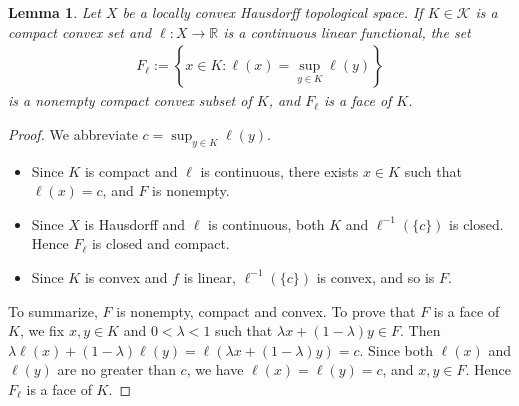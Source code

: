 \documentclass{article}
\numberwithin{equation}{section}
\newcommand{\bbR}{\mathbb{R}}
\newcommand{\scr}{\mathscr}
\theoremstyle{plain}
\newtheorem{lemma}[theorem]{Lemma}
\theoremstyle{definition}
\begin{document}
\begin{lemma}\label{kmlemma3}
	Let $X$ be a locally convex Hausdorff topological space. If $K\in\scr{K}$ is a compact convex set and $\ell:X\to\bbR$ is a continuous linear functional, the set
	\begin{align*}
		F_\ell:=\left\{x\in K:\ell(x)=\sup_{y\in K}\ell(y)\right\}
	\end{align*}
	is a nonempty compact convex subset of $K$, and $F_\ell$ is a face of $K$.
\end{lemma}
\begin{proof}
	We abbreviate $c=\sup_{y\in K} \ell(y)$. 
	\begin{itemize}
		\item Since $K$ is compact and $\ell$ is continuous, there exists $x\in K$ such that $\ell(x)=c$, and $F$ is nonempty. 
		\item Since $X$ is Hausdorff and $\ell$ is continuous, both $K$ and $\ell^{-1}(\{c\})$ is closed. Hence $F_\ell$ is closed and compact.
		\item Since $K$ is convex and $f$ is linear, $\ell^{-1}(\{c\})$ is convex, and so is $F$.
	\end{itemize}
	To summarize, $F$ is nonempty, compact and convex. To prove that $F$ is a face of $K$, we fix $x,y\in K$ and $0<\lambda<1$ such that $\lambda x+(1-\lambda)y\in F$. Then $\lambda \ell(x)+(1-\lambda)\ell(y)=\ell(\lambda x+(1-\lambda)y)=c$. Since both $\ell(x)$ and $\ell(y)$ are no greater than $c$, we have $\ell(x)=\ell(y)=c$, and $x,y\in F$. Hence $F_\ell$ is a face of $K$.
\end{proof}
\end{document}
